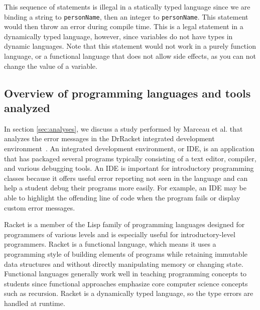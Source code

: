 \documentclass{sig-alternate}
\begin{document}
This sequence of statements is illegal in a statically typed language since we are binding a string to \texttt{personName}, then an integer to \texttt{personName}.
This statement would then throw an error during compile time.
This is a legal statement in a dynamically typed language, however, since variables do not have types in dynamic languages.
Note that this statement would not work in a purely function language, or a functional language that does not allow side effects, as you can not change the value of a variable.

\subsection{Overview of programming languages and tools analyzed}\label{subsec:languages}

In section \ref{sec:analyses}, we discuss a study performed by Marceau et al. that analyzes the error messages in the DrRacket integrated development environment~\cite{Marceau:2011:MEE:1953163.1953308}.
An integrated development environment, or IDE, is an application that has packaged several programs typically consisting of a text editor, compiler, and various debugging tools.
An IDE is important for introductory programming classes because it offers useful error reporting not seen in the language and can help a student debug their programs more easily.
For example, an IDE may be able to highlight the offending line of code when the program fails or display custom error messages.

Racket is a member of the Lisp family of programming languages designed for programmers of various levels and is especially useful for introductory-level programmers.
Racket is a functional language, which means it uses a programming style of building elements of programs while retaining immutable data structures 
and without directly manipulating memory or changing state.
Functional languages generally work well in teaching programming concepts to students since functional approaches emphasize core computer science concepts such as recursion.
Racket is a dynamically typed language, so the type errors are handled at runtime.
\end{document}

